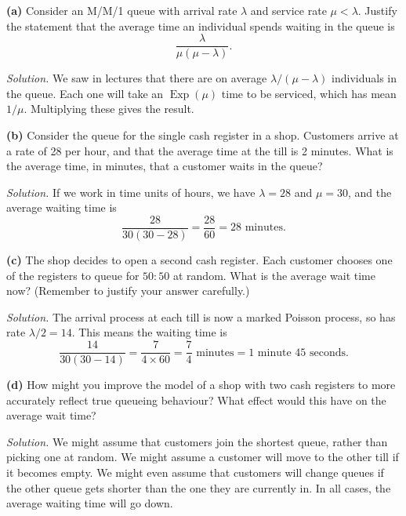 \documentclass[
  a4paper,
]{article}
\theoremstyle{definition}
\theoremstyle{definition}
\theoremstyle{definition}
\theoremstyle{remark}
\begin{document}
\textbf{(a)} Consider an M/M/1 queue with arrival rate \(\lambda\) and service rate \(\mu < \lambda\).
Justify the statement that the average time an individual spends waiting in the queue is
\[ \frac{\lambda}{\mu(\mu - \lambda)} . \]

\begin{myanswers}
\emph{Solution.}
We saw in lectures that there are on average \(\lambda/(\mu-\lambda)\) individuals in the queue. Each one will take an \(\operatorname{Exp}(\mu)\) time to be serviced, which has mean \(1/\mu\). Multiplying these gives the result.

\end{myanswers}

\textbf{(b)} Consider the queue for the single cash register in a shop. Customers arrive at a rate of 28 per hour, and that the average time at the till is 2 minutes. What is the average time, in minutes, that a customer waits in the queue?

\begin{myanswers}
\emph{Solution.}
If we work in time units of hours, we have \(\lambda = 28\) and \(\mu = 30\), and the average waiting time is
\[ \frac{28}{30(30-28)} = \frac{28}{60} = 28 \text{ minutes.}  \]

\end{myanswers}

\textbf{(c)} The shop decides to open a second cash register. Each customer chooses one of the registers to queue for \(50:50\) at random. What is the average wait time now? (Remember to justify your answer carefully.)

\begin{myanswers}
\emph{Solution.}
The arrival process at each till is now a marked Poisson process, so has rate \(\lambda/2 = 14\). This means the waiting time is
\[ \frac{14}{30(30-14)} = \frac{7}{4\times 60} = \frac74 \text{ minutes} = \text{1 minute 45 seconds.}  \]

\end{myanswers}

\textbf{(d)} How might you improve the model of a shop with two cash registers to more accurately reflect true queueing behaviour? What effect would this have on the average wait time?

\begin{myanswers}
\emph{Solution.}
We might assume that customers join the shortest queue, rather than picking one at random. We might assume a customer will move to the other till if it becomes empty. We might even assume that customers will change queues if the other queue gets shorter than the one they are currently in. In all cases, the average waiting time will go down.

\end{myanswers}
\end{document}

